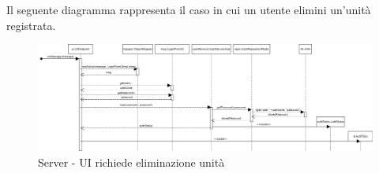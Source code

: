 \newpage

\begin{landscape}
    Il seguente diagramma rappresenta il caso in cui un utente elimini un'unità registrata.
    \begin{figure}[H]
        \centering
        \includegraphics[width=25.7cm]{img/server_seq3.png}
        \caption{Server - UI richiede eliminazione unità}
    \end{figure}
\end{landscape}
